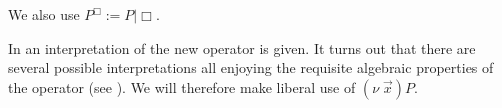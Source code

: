 \documentclass[12pt]{llncs}
\begin{document}
We also use $P^{\Box} := P|\Box$.

In \cite{MeredithR05} an interpretation of the new operator is
given. It turns out that there are several possible interpretations
all enjoying the requisite algebraic properties of the operator (see
\cite{milner91polyadicpi}). We will therefore make liberal use of
$(\nu\; \vec{x})P$.


 

 

 


%


% 





% 


 


\newpage


   



\end{document}
